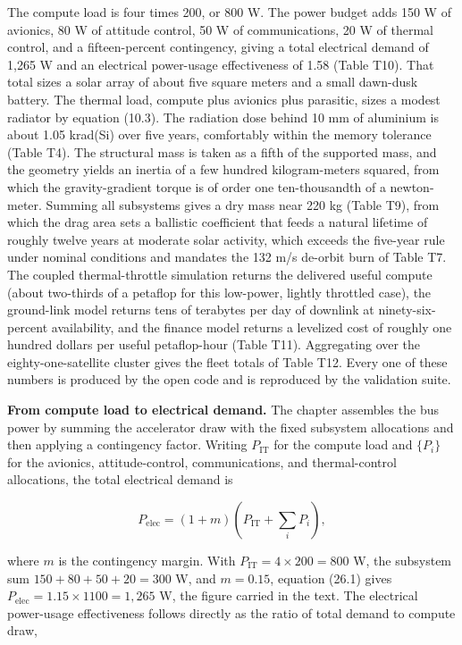 \documentclass[
  11pt,
  openany,
  oneside]{book}
\begin{document}
The compute load is four times 200, or 800 W. The power budget adds 150
W of avionics, 80 W of attitude control, 50 W of communications, 20 W of
thermal control, and a fifteen-percent contingency, giving a total
electrical demand of 1,265 W and an electrical power-usage effectiveness
of 1.58 (Table T10). That total sizes a solar array of about five square
meters and a small dawn-dusk battery. The thermal load, compute plus
avionics plus parasitic, sizes a modest radiator by equation (10.3). The
radiation dose behind 10 mm of aluminium is about 1.05 krad(Si) over
five years, comfortably within the memory tolerance (Table T4). The
structural mass is taken as a fifth of the supported mass, and the
geometry yields an inertia of a few hundred kilogram-meters squared,
from which the gravity-gradient torque is of order one ten-thousandth of
a newton-meter. Summing all subsystems gives a dry mass near 220 kg
(Table T9), from which the drag area sets a ballistic coefficient that
feeds a natural lifetime of roughly twelve years at moderate solar
activity, which exceeds the five-year rule under nominal conditions and
mandates the 132 m/s de-orbit burn of Table T7. The coupled
thermal-throttle simulation returns the delivered useful compute (about
two-thirds of a petaflop for this low-power, lightly throttled case),
the ground-link model returns tens of terabytes per day of downlink at
ninety-six-percent availability, and the finance model returns a
levelized cost of roughly one hundred dollars per useful petaflop-hour
(Table T11). Aggregating over the eighty-one-satellite cluster gives the
fleet totals of Table T12. Every one of these numbers is produced by the
open code and is reproduced by the validation suite.

\textbf{From compute load to electrical demand.} The chapter assembles
the bus power by summing the accelerator draw with the fixed subsystem
allocations and then applying a contingency factor. Writing
\(P_{\text{IT}}\) for the compute load and \(\{P_i\}\) for the avionics,
attitude-control, communications, and thermal-control allocations, the
total electrical demand is

\begin{equation}
P_{\text{elec}} = (1+m)\left(P_{\text{IT}} + \sum_i P_i\right), \tag{26.1}
\end{equation}

where \(m\) is the contingency margin. With
\(P_{\text{IT}} = 4 \times 200 = 800\) W, the subsystem sum
\(150 + 80 + 50 + 20 = 300\) W, and \(m = 0.15\), equation (26.1) gives
\(P_{\text{elec}} = 1.15 \times 1100 = 1{,}265\) W, the figure carried
in the text. The electrical power-usage effectiveness follows directly
as the ratio of total demand to compute draw,
\end{document}
